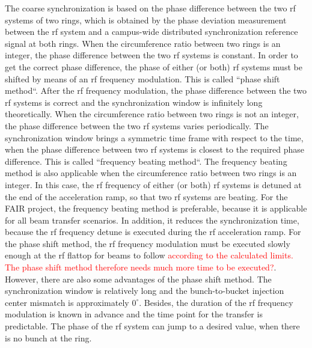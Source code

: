 The coarse synchronization is based on the phase difference between the two rf systems of two rings, which is obtained by the phase deviation measurement between the rf system and a campus-wide distributed synchronization reference signal at both rings. When the circumference ratio between two rings is an integer, the phase difference between the two rf systems is constant. In order to get the correct phase difference, the phase of either (or both) rf systems must be shifted by means of an rf frequency modulation. This is called ``phase shift method``. After the rf frequency modulation, the phase difference between the two rf systems is correct and the synchronization window is infinitely long theoretically. When the circumference ratio between two rings is not an integer, the phase difference between the two rf systems varies periodically. The synchronization window brings a symmetric time frame with respect to the time, when the phase difference between two rf systems is closest to the required phase difference. This is called ``frequency beating method``. The frequency beating method is also applicable when the circumference ratio between two rings is an integer. In this case, the rf frequency of either (or both) rf systems is detuned at the end of the acceleration ramp, so that two rf systems are beating. For the FAIR project, the frequency beating method is preferable, because it is applicable for all beam transfer scenarios. In addition, it reduces the synchronization time, because the rf frequency detune is executed during the rf acceleration ramp. For the phase shift method, the rf frequency modulation must be executed slowly enough at the rf flattop for beams to follow \textcolor{red}{according to the calculated limits. The phase shift method therefore needs much more time to be executed?}. However, there are also some advantages of the phase shift method. The synchronization window is relatively long and the bunch-to-bucket injection center mismatch is approximately $0^\circ$. Besides, the duration of the rf frequency modulation is known in advance and the time point for the transfer is predictable. The phase of the rf system can jump to a desired value, when there is no bunch at the ring.  



